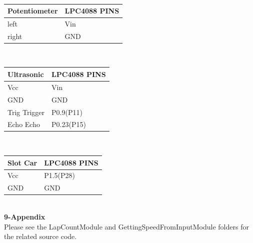 \documentclass{article}
\begin{document}
\\[1in]
\begin{tabular}{| C{5cm} | C{5cm} |}
\hline
Potentiometer&LPC4088 PINS\\
\hline
left & Vin\\
\hline
right & GND\\
\hline
\end{tabular}
\\[1in]
\begin{tabular}{| C{5cm} | C{5cm} |}
\hline
Ultrasonic&LPC4088 PINS\\
\hline
Vcc & Vin\\
\hline
GND & GND\\
\hline
Trig Trigger & P0.9(P11)\\
\hline
Echo Echo & P0.23(P15)\\
\hline
\end{tabular}
\\[1in]
\begin{tabular}{| C{5cm} | C{5cm} |}
\hline
Slot Car&LPC4088 PINS\\
\hline
Vcc & P1.5(P28)\\
\hline
GND & GND\\
\hline
\end{tabular}
\\
\clearpage
{\huge\textbf {9-Appendix}}
\\[0.5in]
Please see the LapCountModule and GettingSpeedFromInputModule folders for the
related source code.
\end{document}
